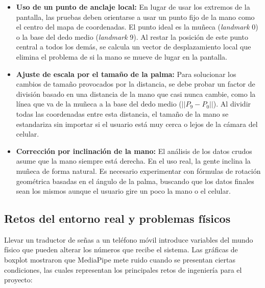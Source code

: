	\begin{itemize}
		\item \textbf{Uso de un punto de anclaje local:} En lugar de usar los extremos de la pantalla, las pruebas deben orientarse a usar un punto fijo de la mano como el centro del mapa de coordenadas. El punto ideal es la muñeca (\textit{landmark} 0) o la base del dedo medio (\textit{landmark} 9). Al restar la posición de este punto central a todos los demás, se calcula un vector de desplazamiento local que elimina el problema de si la mano se mueve de lugar en la pantalla.
		\item \textbf{Ajuste de escala por el tamaño de la palma:} Para solucionar los cambios de tamaño provocados por la distancia, se debe probar un factor de división basado en una distancia de la mano que casi nunca cambie, como la línea que va de la muñeca a la base del dedo medio ($||P_9 - P_0||$). Al dividir todas las coordenadas entre esta distancia, el tamaño de la mano se estandariza sin importar si el usuario está muy cerca o lejos de la cámara del celular.
		\item \textbf{Corrección por inclinación de la mano:} El análisis de los datos crudos asume que la mano siempre está derecha. En el uso real, la gente inclina la muñeca de forma natural. Es necesario experimentar con fórmulas de rotación geométrica basadas en el ángulo de la palma, buscando que los datos finales sean los mismos aunque el usuario gire un poco la mano o el celular.
	\end{itemize}
	
	\subsection{Retos del entorno real y problemas físicos}
	
	Llevar un traductor de señas a un teléfono móvil introduce variables del mundo físico que pueden alterar los números que recibe el sistema. Las gráficas de boxplot mostraron que MediaPipe mete ruido cuando se presentan ciertas condiciones, las cuales representan los principales retos de ingeniería para el proyecto:
	
